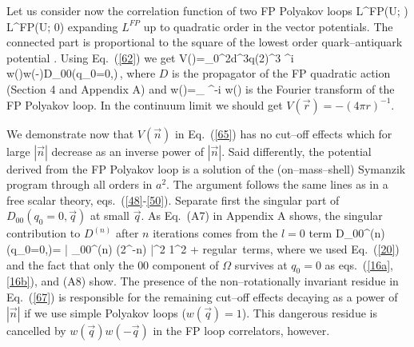 Let us consider now the correlation function of two FP Polyakov loops
\bee
\langle L^{FP}(U; ) L^{FP}(U; 0) \rangle       \label{64}
\ee
expanding $L^{FP}$ up to quadratic order in the vector potentials. 
The connected part is proportional to the square of the lowest order 
quark--antiquark potential \cite{REISZ}. 
Using Eq.~(\ref{62}) we get 
\bee
V()=\int_0^{2\pi}{d^3q\over (2\pi)^3}
\rme^{i} w()w(-)D_{00}(q_0=0,)\,, \label{65}
\ee
where $D$ is the propagator of the FP quadratic action 
(Section 4 and Appendix A) and
\bee
w()=\sum_{} \rme^{-i} w()        \label{66}
\ee
is the Fourier transform of the FP Polyakov loop. 
In the continuum limit we should get $V(\vec{r})=-(4\pi r)^{-1}$.

We demonstrate now that $V(\vec{n})$ in Eq.~(\ref{65}) has no cut--off effects
which for large $|\vec{n}|$ decrease  as an inverse power of 
$|\vec{n}|$. 
Said differently, the potential derived from the FP Polyakov loop 
is a solution of the (on--mass--shell) Symanzik program through
 all orders in $a^2$.
The argument follows the same lines as in a free scalar theory, 
eqs.~(\ref{48}-\ref{50}).
Separate first the singular part of $D_{00}(q_0=0,\vec{q})$ at small 
$\vec{q}$. As Eq.~(A7) in Appendix A shows, the singular contribution to 
$D^{(n)}$ after $n$ iterations comes from the $l=0$ term
\bee
D_{00}^{(n)}(q_0=0,)= \left| 
\Omega_{00}^{(n)} \left(2^{-n}\right) \right|^2 {1\over {}^2}
+ {\rm regular~terms},                                      \label{67}
\ee
where we used Eq.~(\ref{20}) and the fact that only the $00$ 
component of $\Omega$ survives at $q_0=0$ as eqs.~(\ref{16a},\ref{16b}),
and (A8) show. The presence of the non--rotationally invariant residue
in Eq.~(\ref{67}) is responsible for the remaining cut--off effects
decaying as a power of $|\vec{n}|$ if we use simple Polyakov loops
($w(\vec{q}) = 1$). This dangerous residue is cancelled by
$w(\vec{q}) w(-\vec{q})$ in the FP loop correlators, however.

